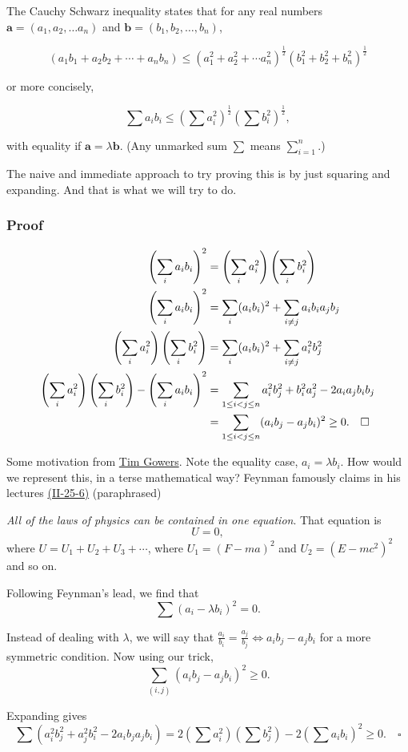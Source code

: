 \documentclass[11]{article}
\title{\sc{Proof of Cauchy-Schwarz by Brute Force}}
\author{\sc{Rahul}}
\date{\today}
\begin{document}
\maketitle
The Cauchy Schwarz inequality states that for any real numbers $\mathbf{a} = (a_1, a_2, \dots a_n)$ and $\mathbf{b} = (b_1, b_2, \dots, b_n)$,

\[(a_1 b_1 + a_2 b_2 + \cdots + a_n b_n) \leq (a_1^2 + a_2^2 + \cdots a_n^2)^{\frac12} (b_1^2 + b_2^2 + b_n^2)^{\frac12}\]

or more concisely,

\[\sum a_i b_i \leq \left(\sum a_i^2\right)^{\frac12} \left(\sum b_i^2\right)^{\frac12},\]

with equality if $\mathbf{a} = \lambda \mathbf{b}$.
(Any unmarked sum $\displaystyle\sum$ means $\displaystyle\sum_{i=1}^n.$)

The naive and immediate approach to try proving this is by just squaring and expanding. And that is what we will try to do.

\subsubsection*{Proof}

\begin{align*}
\left(\sum_i a_i b_i \right)^2 &= \left(\sum_i a_i^2\right)\left(\sum_i b_i^2\right)\\
\left(\sum_i a_i b_i \right)^2 &= \sum_i (a_i b_i)^2 + \sum_{i \neq j} a_i b_i a_j b_j\\
\left(\sum_i a_i^2\right)\left(\sum_i b_i^2\right) &= \sum_i (a_i b_i)^2 + \sum_{i\neq j} a_i^2 b_j^2\\
\left(\sum_i a_i^2\right)\left(\sum_i b_i^2\right) - \left(\sum_i a_i b_i \right)^2
&= \sum_{1\leq i<j\leq n} a_i^2 b_j^2 + b_i^2 a_j^2 - 2a_ia_j b_i b_j\\
&=\sum_{1\leq i<j\leq n}(a_i b_j - a_j b_i)^2 \geq 0. \quad \hfill \square
\end{align*}

Some motivation from \href{https://www.dpmms.cam.ac.uk/~wtg10/csineq.html}{Tim Gowers}. Note the equality case, $a_i = \lambda b_i$. How would we represent this, in a terse mathematical way? Feynman famously claims in his lectures \href{https://www.feynmanlectures.caltech.edu/II_25.html}{(II-25-6)} (paraphrased)
\begin{displayquote}
\textit{All of the laws of physics can be contained in one equation}. That equation is $$U=0,$$where $U = U_1 + U_2 + U_3 + \dotsm$, where $U_1 = (F-ma)^2$ and $U_2 = (E - mc^2)^2$ and so on.
\end{displayquote}

Following Feynman's lead, we find that $$\sum \left(a_i - \lambda b_i\right)^2 = 0.$$

Instead of dealing with $\lambda$, we will say that $\frac{a_i}{b_i} = \frac{a_j}{b_j} \iff a_i b_j - a_jb_i$ for a more symmetric condition. Now using our trick,
$$\sum_{(i,j)} (a_i b_j - a_jb_i)^2 \geq 0.$$

Expanding gives $$\sum(a_i^2b_j^2 +a_j^2b_i^2 -2a_ib_ja_jb_i) = 2\left(\sum a_i^2\right) \left(\sum b_j^2\right) - 2\left(\sum a_ib_i\right)^2 \geq 0. \quad \square$$
\end{document}

